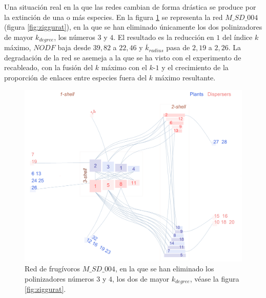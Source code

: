 Una situación real en la que las redes cambian de forma drástica se produce por la extinción de una o más especies. En la figura \ref{fig:VIS_M_SD_004_pol3_pol4_ziggurat} se representa la red $M\_SD\_004$ (figura \ref{fig:ziggurat}), en la que se han eliminado únicamente los dos polinizadores de mayor $k_{degree}$, los números $3$ y $4$. El resultado es la reducción en $1$ del índice $k$ máximo, $NODF$ baja desde $39,82$ a $22,46$ y $\overline k_{radius}$ pasa de $2,19$ a $2,26$. La degradación de la red se asemeja a la que se ha visto con el experimento de recableado, con la fusión del $k$ máximo con el $k$-$1$ y el crecimiento de la proporción de enlaces entre especies fuera del $k$ máximo resultante.

\begin{figure}[ht!]
\centering
\includegraphics[scale=0.5]{Figures/VIS_M_SD_004_pol3_pol4_ziggurat.png}
\caption {Red de frugívoros $M\_SD\_004$, en la que se han eliminado los polinizadores números $3$ y $4$, los dos de mayor $k_{degree}$, véase la figura \ref{fig:ziggurat}.} 
\label{fig:VIS_M_SD_004_pol3_pol4_ziggurat}
\end{figure}

